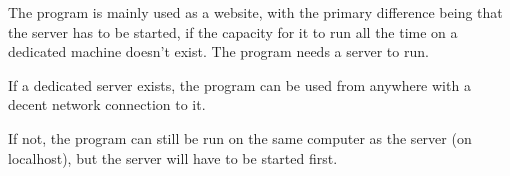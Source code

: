 The program is mainly used as a website, with the primary difference being
 that the server has to be started, if the capacity for it to run 
 all the time on a dedicated machine doesn't exist. 
The program needs a server to run. 

If a dedicated server exists, the program can be used from anywhere
 with a decent network connection to it.

If not, the program can still be run on the same computer as 
the server (on localhost), but the server will have to be started first.
 

